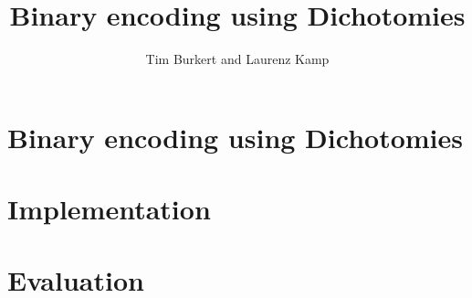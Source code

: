 \documentclass[parskip,11pt,nochapterpage,bigchapter,linedtoc,colorback,accentcolor=tud1d,openany]{tudreport}
\title{Binary encoding using Dichotomies}
\subtitle{Tim Burkert and Laurenz Kamp}
\begin{document}
\maketitle
\tableofcontents

\chapter{Binary encoding using Dichotomies}

\chapter{Implementation}

\chapter{Evaluation}
\end{document}
